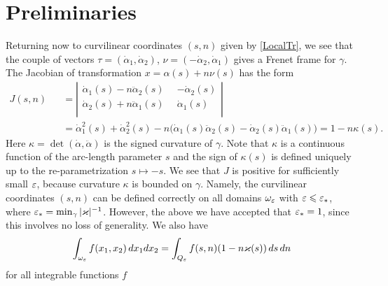 
\section{Preliminaries}


Returning now to curvilinear coordinates $(s,n)$ given by \eqref{LocalTr},
we see that the couple of vectors
$ \tau=(\dot{\alpha}_1, \dot{\alpha}_2)$, $\nu=(-\dot{\alpha}_2, \dot{\alpha}_1)$
gives a Frenet frame for $\gamma$.
The Jacobian of transformation $x=\alpha(s)+n\nu(s)$ has the form
\begin{eqnarray}\nonumber
J(s,n)&&=
\left|
        \begin{array}{cr}
          \dot{\alpha}_1(s)-n\ddot{\alpha}_2(s)\phantom{0} &  -\dot{\alpha}_2(s)\\
          \dot{\alpha}_2(s)+n\ddot{\alpha}_1(s)\phantom{0} & \dot{\alpha}_1(s)\\
        \end{array}
      \right|\\\nonumber
&&=\dot{\alpha}_1^2(s)+\dot{\alpha}_2^2(s)
-n\big(\dot{\alpha}_1(s)\ddot{\alpha}_2(s)-
  \dot{\alpha}_2(s)\ddot{\alpha}_1(s)\big)=1-n \kappa(s).
\end{eqnarray}
Here $\kappa=\det(\dot{\alpha},\ddot{\alpha})$ is the signed curvature of $\gamma$. Note that $\kappa$ is a continuous function
of the arc-length parameter $s$ and the sign of $\kappa(s)$ is defined uniquely up to the re-parametrization $s\mapsto-s$.
We see that $J$ is positive for sufficiently small $\varepsilon$, because  curvature $\kappa$  is  bounded on $\gamma$.
Namely, the curvilinear coordinates $(s,n)$ can be defined correctly on all domains $\omega_\varepsilon$ with $\varepsilon\leqslant \varepsilon_*$, where
$\varepsilon_*=\min_{\gamma}|\varkappa|^{-1}$.
However, the above we have accepted that $\varepsilon_*=1$, since this
involves no loss of generality. We also have
\begin{equation}\label{IntegralCh}
  \int_{\omega_\varepsilon} f(x_1,x_2)\,dx_1dx_2=\int_{Q_\varepsilon} f(s,n)(1-n\varkappa(s))\,ds\,dn
\end{equation}
for all integrable functions $f$

